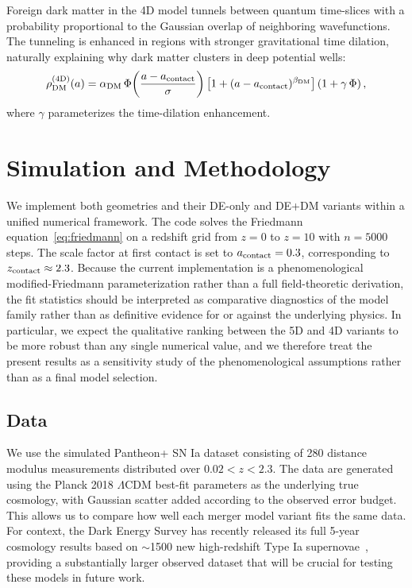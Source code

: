 \documentclass[12pt]{article}
\begin{document}
Foreign dark matter in the 4D model tunnels between quantum time-slices with a probability proportional to the Gaussian overlap of neighboring wavefunctions. The tunneling is enhanced in regions with stronger gravitational time dilation, naturally explaining why dark matter clusters in deep potential wells:
\begin{equation}
\rho_{\rm DM}^{\rm (4D)}(a) = \alpha_{\rm DM} \, \Phi\!\left(\frac{a-a_{\rm contact}}{\sigma}\right) \left[1 + (a-a_{\rm contact})^{\beta_{\rm DM}}\right] \left(1 + \gamma \, \Phi\right),
\label{eq:dm_4d}
\end{equation}
where $\gamma$ parameterizes the time-dilation enhancement.

\section{Simulation and Methodology}

We implement both geometries and their DE-only and DE+DM variants within a unified numerical framework. The code solves the Friedmann equation~\eqref{eq:friedmann} on a redshift grid from $z=0$ to $z=10$ with $n=5000$ steps. The scale factor at first contact is set to $a_{\rm contact}=0.3$, corresponding to $z_{\rm contact}\approx 2.3$. Because the current implementation is a phenomenological modified-Friedmann parameterization rather than a full field-theoretic derivation, the fit statistics should be interpreted as comparative diagnostics of the model family rather than as definitive evidence for or against the underlying physics. In particular, we expect the qualitative ranking between the 5D and 4D variants to be more robust than any single numerical value, and we therefore treat the present results as a sensitivity study of the phenomenological assumptions rather than as a final model selection.

\subsection{Data}

We use the simulated Pantheon+ SN Ia dataset consisting of 280 distance modulus measurements distributed over $0.02 < z < 2.3$. The data are generated using the Planck 2018 $\Lambda$CDM best-fit parameters as the underlying true cosmology, with Gaussian scatter added according to the observed error budget. This allows us to compare how well each merger model variant fits the same data. For context, the Dark Energy Survey has recently released its full 5-year cosmology results based on $\sim$1500 new high-redshift Type Ia supernovae~\cite{abbott2024dark}, providing a substantially larger observed dataset that will be crucial for testing these models in future work.
\end{document}
